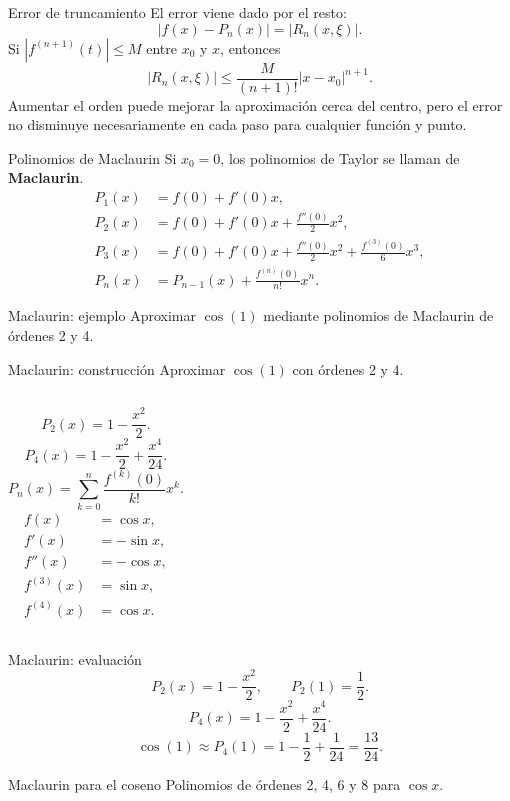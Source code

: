 \documentclass[original_version/main.tex]{subfiles}
\begin{document}
\begin{frame}[t]{Error de truncamiento}
El error viene dado por el resto:
\[|f(x)-P_n(x)|=|R_n(x,\xi)|.\]
Si $|f^{(n+1)}(t)|\le M$ entre $x_0$ y $x$, entonces
\[|R_n(x,\xi)|\le\frac{M}{(n+1)!}|x-x_0|^{n+1}.\]
Aumentar el orden puede mejorar la aproximación cerca del centro, pero el error no disminuye necesariamente en cada paso para cualquier función y punto.
\end{frame}
\begin{frame}[t]{Polinomios de Maclaurin}
\small Si $x_0=0$, los polinomios de Taylor se llaman de \textbf{Maclaurin}.
\begin{align*}
P_1(x)&=f(0)+f'(0)x,\\
P_2(x)&=f(0)+f'(0)x+\frac{f''(0)}{2}x^2,\\
P_3(x)&=f(0)+f'(0)x+\frac{f''(0)}{2}x^2+\frac{f^{(3)}(0)}{6}x^3,\\
P_n(x)&=P_{n-1}(x)+\frac{f^{(n)}(0)}{n!}x^n.
\end{align*}
\end{frame}
\begin{frame}[t]{Maclaurin: ejemplo}
Aproximar $\cos(1)$ mediante polinomios de Maclaurin de órdenes 2 y 4.
\end{frame}
\begin{frame}[t]{Maclaurin: construcción}
\small Aproximar $\cos(1)$ con órdenes 2 y 4.
\begin{columns}[T]
\[P_2(x)=1-\frac{x^2}{2}.\]
\[P_4(x)=1-\frac{x^2}{2}+\frac{x^4}{24}.\]
\[P_n(x)=\sum_{k=0}^n\frac{f^{(k)}(0)}{k!}x^k.\]
\begin{align*}f(x)&=\cos x,\\f'(x)&=-\sin x,\\f''(x)&=-\cos x,\\f^{(3)}(x)&=\sin x,\\f^{(4)}(x)&=\cos x.\end{align*}
\end{columns}
\end{frame}
\begin{frame}[t]{Maclaurin: evaluación}
\[P_2(x)=1-\frac{x^2}{2},\qquad P_2(1)=\frac12.\]
\[P_4(x)=1-\frac{x^2}{2}+\frac{x^4}{24}.\]
\[\cos(1)\approx P_4(1)=1-\frac12+\frac1{24}=\frac{13}{24}.\]
\end{frame}
\begin{frame}[t]{Maclaurin para el coseno}
\small Polinomios de órdenes 2, 4, 6 y 8 para $\cos x$.\begin{columns}\end{columns}
\end{frame}
\end{document}
